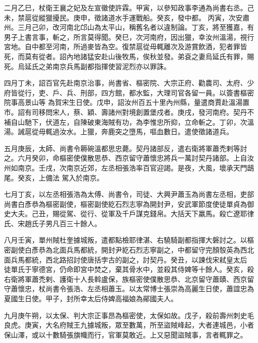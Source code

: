 \begin{pinyinscope}
 二月乙巳，杖衛王襄之妃及左宣徽使許霖。甲寅，以參知政事李通為尚書右丞。己未，禁扈從縱獵擾民。庚申，徵諸道水手運戰船。癸亥，發中都。
 丙寅，次安肅州。三月己卯，改河南北邙山為太平山，稱舊名者以違制論。丁亥，將至獲嘉，有男子上書言事，斬之，所言莫得聞。癸巳，次河南府，因出獵，幸汝州溫湯，視行宮地。自中都至河南，所過麥皆為空。復禁扈從毋輒離次及游賞飲酒，犯者罪皆死，而莫有從者。詔內地諸猛安赴山後牧馬，俟秋並發。弟袞之妻烏延氏有罪，賜死。烏延氏之弟南京兵馬副都指揮使習泥烈亦以罪誅。



 四月丁未，詔百官先赴南京治事，尚書省、樞密院、大宗正府、勸農司、太府、少府皆從行，吏、戶、兵、刑部，四方館，都水監，大理司官各留一員。以簽書樞密院事高景山等
 為賀宋生日使。戊申，詔汝州百五十里內州縣，量遣商賈赴溫湯置市。詔有司移問宋人，蔡、穎、壽諸州對境創置堡戍者。庚戌，發河南府。契丹不補自山馳下，伏道左，自陳破東海賊有功，為李惟忠所抑，立命斬之。丁卯，次溫湯。誡扈從毋輒過汝水。上獵，奔鹿突之墮馬，嘔血數日。遣使徵諸道兵。



 五月庚辰，太師、尚書令耨碗溫都思忠薨。契丹諸部反，遣右衛將軍蕭禿剌等討之。六月癸卯，命樞密使僕散思恭、西京留守蕭懷忠將兵一萬討契丹諸部。上自汝州如南京。壬戌，次南京近郊，左丞相張浩率百官迎謁。是夜，大風，壞承天門鴟尾。癸亥，上備法
 駕入於南京。



 七月丁亥，以左丞相張浩為太傅、尚書令，司徒、大興尹蕭玉為尚書左丞相，吏部尚書白彥恭為樞密副使，樞密副使紇石烈志寧為開封尹，安武軍節度使徒單貞為御史大夫。己丑，賜從駕、從行、從軍及千戶謀克錢帛。大括天下羸馬。殺亡遼耶律氏、宋趙氏子男凡百三十餘人。



 八月壬寅，單州賊杜奎據城叛，遣都點檢耶律湛、右驍騎副都指揮大磐討之。以樞密副使白彥恭為北面兵馬都統，開封尹紇石烈志寧副之，中都留守完顏彀英為西北面兵馬都統，西北路招討使唐括孛古的副之，討契丹。癸丑，以諫伐宋弒皇太后
 徒單氏于寧德宮，仍命即宮中焚之，棄其骨水中，並殺其侍婢等十餘人。癸亥，殺右衛將軍蕭禿剌、護衛十人長斡盧保，族樞密使僕散思恭、北京留守蕭賾、西京留守蕭懷忠，杖尚書令張浩、左丞相蕭玉。以太常博士張崇為高麗生日使，蕭誼忠為夏國生日使。甲子，封所幸太后侍婢高福娘為鄖國夫人。



 九月庚午朔，以太保、判大宗正事昂為樞密使，太保如故。戊子，殺前壽州刺史毛良虎。庚寅，大名府賊王九據城叛，眾至數萬，所至盜賊峰起，大者連城邑，小者保山澤，或以十數騎張旗幟而行，官軍莫敢近。上又惡聞盜賊事，言者輒罪之。




\end{pinyinscope}
